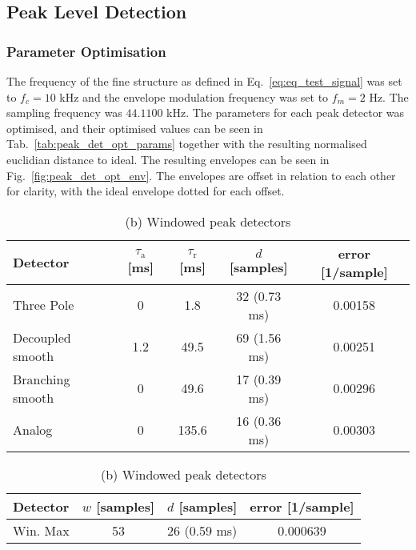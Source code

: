 \documentclass[../main2.tex]{subfiles}
\begin{document}
\subsection{Peak Level Detection}

\subsubsection{Parameter Optimisation}
The frequency of the fine structure as defined in Eq.~\eqref{eq:eq_test_signal} was set to $f_c = 10$ kHz and the envelope modulation frequency was set to $f_m = 2$ Hz. The sampling frequency was $44.1100$ kHz. The parameters for each peak detector was optimised, and their optimised values can be seen in Tab.~\ref{tab:peak_det_opt_params} together with the resulting normalised euclidian distance to ideal. The resulting envelopes can be seen in Fig.~\ref{fig:peak_det_opt_env}. The envelopes are offset in relation to each other for clarity, with the ideal envelope dotted for each offset. 

\begin{table}[h]
\begin{center}
\caption{Optimised parameters for the various peak detectors, $f_c=10 $  kHz, $f_m=2 $}
\label{tab:peak_det_opt_params}
\caption*{(a) Attack and release peak detectors}
\begin{tabular}{| l | c c c | c |}
	\hline
	Detector 	& $\tau_\text{a}$ [ms] & $\tau_\text{r}$ [ms] & $d$ [samples] & error [1/sample]\\
	\hline
	Three Pole	& 0		& 1.8 	& 32	(0.73 ms)	& 0.00158	\\
	Decoupled smooth	& 1.2		& 49.5 	& 69	(1.56 ms)	& 0.00251	\\
	Branching smooth 	& 0	 		& 49.6 	& 17	(0.39 ms)	& 0.00296	\\ 
	Analog 			& 0 			& 135.6 	& 16	(0.36 ms)	& 0.00303	\\ 

	\hline
\end{tabular}
\end{center}

\begin{center}
\caption*{(b) Windowed peak detectors}
\label{tab:peak_det_instatt_opt_params}
 \begin{tabular}{| l | c c  | c |}
	\hline
	Detector & $w$ [samples] & $d$ [samples] & error [1/sample] \\
	\hline
	Win. Max		& 53		& 26	(0.59 ms)	& 0.000639	\\ 
	\hline
\end{tabular}
\end{center}

\end{table}
\end{document}
